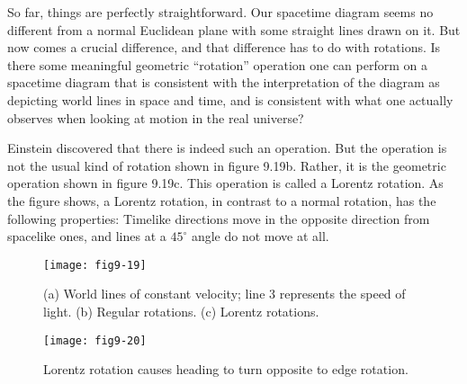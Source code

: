 \documentclass{book}
\begin{document}
So far, things are perfectly straightforward. Our spacetime diagram
seems no different from a normal Euclidean plane with some straight
lines drawn on it. But now comes a crucial difference, and that difference
has to do with rotations. Is there some meaningful geometric ``rotation''
operation one can perform on a spacetime diagram that is consistent
with the interpretation of the diagram as depicting world lines in space
and time, and is consistent with what one actually observes when looking
at motion in the real universe?

Einstein discovered that there is indeed such an operation. But the
operation is not the usual kind of rotation shown in figure 9.19b. Rather,
it is the geometric operation shown in figure 9.19c. This operation is
called a Lorentz rotation. As the figure shows, a Lorentz rotation, in
contrast to a normal rotation, has the following properties: Timelike
directions move in the opposite direction from spacelike ones, and lines
at a $45^{\circ}$ angle do not move at all.

\begin{figure}
\begin{center}
\texttt{[image: fig9-19]}
\caption{(a) World lines of constant velocity; line 3 represents the speed of light. (b) Regular rotations. (c) Lorentz rotations.}
\end{center}
\end{figure}

\begin{figure}
\begin{center}
\texttt{[image: fig9-20]}
\caption{Lorentz rotation causes heading to turn opposite to edge rotation.}
\end{center}
\end{figure}
\end{document}
